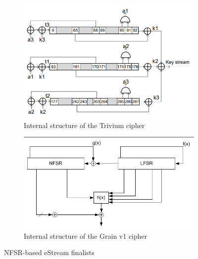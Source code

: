 \begin{description}
\begin{figure}[h]
		\begin{subfigure}{0.5\textwidth}
			\includegraphics[width=1\textwidth]{img/trivium.png} 
			\caption{Internal structure of the Trivium cipher}
			\label{fig:trivium}
		\end{subfigure}
		\begin{subfigure}{0.5\textwidth}
			\includegraphics[width=1\textwidth]{img/grainv1.png} 
			\caption{Internal structure of the Grain v1 cipher}
			\label{fig:grainv1}
		\end{subfigure}
		
		\caption{NFSR-based eStream finalists}
		\label{fig:nfsr}
		
	\end{figure}
	

\end{description}
